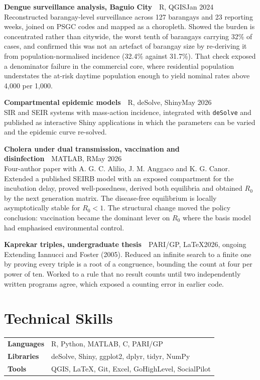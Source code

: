 \documentclass[10pt,a4paper]{article}
\newcommand{\proj}[3]{%
  \textbf{#1}\ \ {\small\textcolor{muted}{#2}}\hfill{\small\textcolor{muted}{#3}}\\[1pt]
}
\begin{document}
{\small
\proj{Dengue surveillance analysis, Baguio City}{R, QGIS}{Jan 2024}
Reconstructed barangay-level surveillance across 127 barangays and 23 reporting
weeks, joined on PSGC codes and mapped as a choropleth. Showed the burden is
concentrated rather than citywide, the worst tenth of barangays carrying 32\% of
cases, and confirmed this was not an artefact of barangay size by re-deriving it
from population-normalised incidence (32.4\% against 31.7\%). That check exposed a
denominator failure in the commercial core, where residential population
understates the at-risk daytime population enough to yield nominal rates above
4,000 per 1,000.

\vspace{4pt}
\proj{Compartmental epidemic models}{R, deSolve, Shiny}{May 2026}
SIR and SEIR systems with mass-action incidence, integrated with \texttt{deSolve}
and published as interactive Shiny applications in which the parameters can be
varied and the epidemic curve re-solved.

\vspace{4pt}
\proj{Cholera under dual transmission, vaccination and disinfection}{MATLAB, R}{May 2026}
Four-author paper with A. G. C. Alilio, J. M. Anggaco and K. G. Canor. Extended a
published SEIRB model with an exposed compartment for the incubation delay, proved
well-posedness, derived both equilibria and obtained $R_0$ by the next generation
matrix. The disease-free equilibrium is locally asymptotically stable for $R_0 < 1$.
The structural change moved the policy conclusion: vaccination became the dominant
lever on $R_0$ where the basis model had emphasised environmental control.

\vspace{4pt}
\proj{Kaprekar triples, undergraduate thesis}{PARI/GP, LaTeX}{2026, ongoing}
Extending Iannucci and Foster (2005). Reduced an infinite search to a finite one by
proving every triple is a root of a congruence, bounding the count at four per power
of ten. Worked to a rule that no result counts until two independently written
programs agree, which exposed a counting error in earlier code.
}

\section{Technical Skills}

{\small
\begin{tabular}{@{}>{\bfseries}p{2.15cm}p{15.3cm}@{}}
Languages & R, Python, MATLAB, C, PARI/GP \\[2pt]
Libraries & deSolve, Shiny, ggplot2, dplyr, tidyr, NumPy \\[2pt]
Tools     & QGIS, LaTeX, Git, Excel, GoHighLevel, SocialPilot \\
\end{tabular}
}
\end{document}
